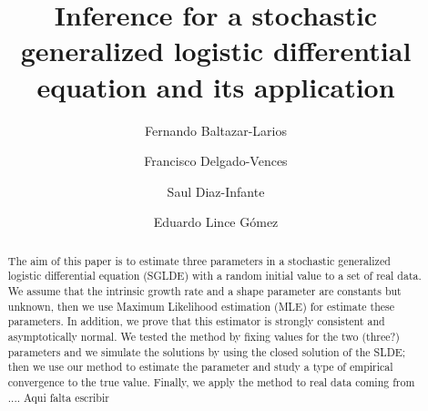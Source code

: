\documentclass[12pt, reqno]{amsart}
\newcommand{\1}{{\bf 1}}
\newcommand{\2}{{\bf 2}}
\theoremstyle{definition}
\theoremstyle{remark}
\numberwithin{equation}{section}
\begin{document}
\title[Inference for a stochastic generalized logistic differential equation]{%
Inference for a stochastic generalized logistic differential equation and its 
application}

\author[F. Baltazar-Larios]{Fernando Baltazar-Larios} %
\address{  {\it F. Baltazar-Larios}.
		Facultad de ciencias - Universidad Nacional Aut\'onoma de M\'exico.  
		Ciudad Universitaria, Ciudad de M\'exico}
	

\author[F. Delgado-Vences]{Francisco Delgado-Vences} 
\address{{\it F. Delgado-Vences}. Conacyt  Research Fellow - Universidad Nacional Aut\'onoma de M\'exico. Instituto de Matem\'aticas, Oaxaca, M\'exico}

\author[S. Diaz-Infante]{Saul Diaz-Infante} 
\address{{\it S. Diaz-Infante}. Conahcyt Research Fellow - Universidad de Sonora - M\'exico}

\textit{}\author[E. Lince]{Eduardo Lince G\'omez} 
\address{  {\it E. Lince G\'omez}.
		Facultad de ciencias - Universidad Nacional Aut\'onoma de M\'exico.  
		Ciudad Universitaria, Ciudad de M\'exico}
	
%

\begin{abstract}
	The aim of this paper is to estimate three parameters in a stochastic 
	generalized logistic differential equation (SGLDE) with a random initial 
	value to a set of real data. We assume that the intrinsic growth rate and a 
	shape parameter are constants but unknown, then we use Maximum Likelihood 
	estimation (MLE) for estimate these parameters. In addition, we prove that 
	this estimator is strongly consistent 
	{\color{red} and asymptotically normal}. We tested the method by fixing  
	values for the two {\color{red} (three?)} parameters and we simulate the 
	solutions by using the closed solution of the SLDE; then we use our method to 
	estimate the parameter and study a type of empirical convergence to the true 
	value. 
	Finally, we apply the method to real data coming from .... {\color{red}  Aqui 
	falta escribir }
\end{abstract}
\end{document}

